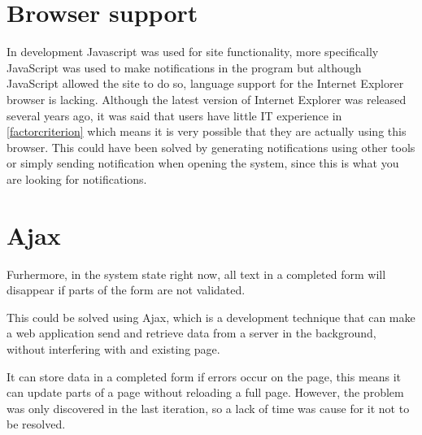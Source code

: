 \section{Browser support}
In development Javascript was used for site functionality, more specifically JavaScript was used to make notifications in the program but although JavaScript allowed the site to do so, language support for the Internet Explorer browser is lacking.
Although the latest version of Internet Explorer was released several years ago, it was said that users have little IT experience in \cref{factorcriterion} which means it is very possible that they are actually using this browser.
This could have been solved by generating notifications using other tools or simply sending notification when opening the system, since this is what you are looking for notifications.

\section{Ajax}

Furhermore, in the system state right now, all text in a completed form will disappear if parts of the form are not validated.

This could be solved using Ajax, which is a development technique that can make a web application send and retrieve data from a server in the background, without interfering with and existing page.

It can store data in a completed form if errors occur on the page, this means it can update parts of a page without reloading a full page.
However, the problem was only discovered in the last iteration, so a lack of time was cause for it not to be resolved.
